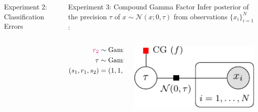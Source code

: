 \documentclass[english]{beamer}
\begin{document}
\begin{frame}
\begin{columns}[t]
\begin{block}{ Experiment 2: Classification Errors}
\end{block}

\begin{block}{ Experiment 3: Compound Gamma Factor }
Infer posterior of the precision $\tau$ of $x \sim \mathcal{N}(x; 0, \tau)$ 
from observations $\{x_i\}_{i=1}^N $:
%
\noindent
\begin{columns}[T]
   \hspace{-5cm}
   \begin{column}{1cm}
       \begin{align*}
          \textcolor{magenta}{r_2} &\sim \mathrm{Gamma}(r_2; s_1, r_1)  \\
          \tau &\sim \mathrm{Gamma}(\tau; s_2, \textcolor{magenta}{r_2} ) \\
          (s_1, r_1, s_2) &= (1, 1, 1).
       \end{align*}
   \end{column}
   \hspace{-10cm}
   \begin{column}{1cm}
   \includegraphics[width=11cm]{img/compound_gamma_graph-crop}
   \end{column}
\end{columns}


\end{block}
\end{columns}
\end{frame}
\end{document}
